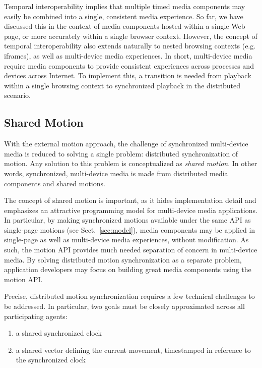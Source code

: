 Temporal interoperability implies that multiple timed media components may
easily be combined into a single, consistent media experience. So far, we have
discussed this in the context of media components hosted within a single Web
page, or more accurately within a single browser context. However, the concept
of temporal interoperability also extends naturally to nested browsing
contexts (e.g. iframes), as well as multi-device media experiences. In short,
multi-device media require media components to provide consistent experiences
across processes and devices across Internet. To implement this, a transition
is needed from playback within a single browsing context to synchronized
playback in the distributed scenario.

\subsection {Shared Motion}

With the external motion approach, the challenge of synchronized multi-device
media is reduced to solving a single problem: distributed synchronization of
motion. Any solution to this problem is conceptualized as \emph{shared motion}. In
other words, synchronized, multi-device media is made from distributed media
components and shared motions.

The concept of shared motion is important, as it hides implementation detail
and emphasizes an attractive programming model for multi-device media
applications. In particular, by making synchronized motions available under
the same API as single-page motions (see Sect.~\ref{sec:model}), media components may be
applied in single-page as well as multi-device media experiences, without
modification. As such, the motion API provides much needed separation of
concern in multi-device media. By solving distributed motion synchronization
as a separate problem, application developers may focus on building great
media components using the motion API.



Precise, distributed motion synchronization requires a few technical
challenges to be addressed. In particular, two goals must be closely
approximated across all participating agents:

\begin{enumerate}
\item{a shared synchronized clock}
\item{a shared vector defining the current movement, timestamped in reference to the
synchronized clock}
\end{enumerate}


